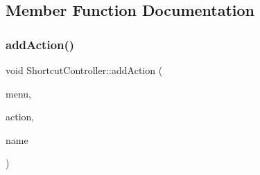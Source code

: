 \subsection{Member Function Documentation}
\mbox{\label{class_q_g_b_a_1_1_shortcut_controller_a55d3769ac28ea39665096105e683a834}} 
\subsubsection{\texorpdfstring{add\+Action()}{addAction()}}
{\footnotesize\ttfamily void Shortcut\+Controller\+::add\+Action (\begin{DoxyParamCaption}\item[{Q\+Menu $\ast$}]{menu,  }\item[{Q\+Action $\ast$}]{action,  }\item[{const Q\+String \&}]{name }\end{DoxyParamCaption})}

